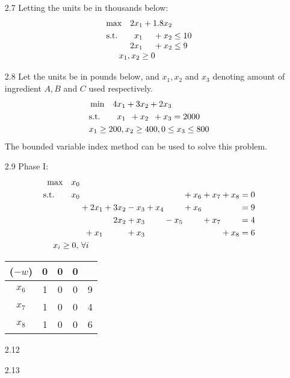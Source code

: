 \documentclass[a4paper,10pt]{article}
\theoremstyle{definition}
\begin{document}
\begin{enumerate}
\item[2.7]
Letting the units be in thousands below: 
\begin{align*}
  \begin{array}{r@{}r@{}l}
    \text{max} \quad 2x_1 &{}+ 1.8x_2 \\[\jot]
    \text{s.t.}\qquad x_1 &{}+ x_2&{} \leq 10 \\
    2x_1 &{}+ x_2&{} \leq 9 \\
     \multicolumn{2}{c}{x_1, x_2 \geq 0}
  \end{array}
\end{align*}
\item[2.8]
Let the units be in pounds below, and $x_1, x_2$ and $x_3$ denoting amount of ingredient $A, B$ and $C$ used respectively.
\begin{align*}
  \begin{array}{r@{}r@{}r@{}l}
    \text{min} \quad 4x_1 &{}+ 3x_2&{}+2x_3 \\[\jot]
    \text{s.t.}\qquad    x_1 &{}+ x_2&{}+x_3&{}=2000 \\[\jot]
     \multicolumn{4}{c}{x_1 \geq 200, x_2 \geq 400 , 0 \leq x_3 \leq 800}
  \end{array}
\end{align*}
The bounded variable index method can be used to solve this problem.

\item[2.9]
Phase I:
\begin{align*}
  \begin{array}{r@{}r@{}r@{}r@{}r@{}r@{}r@{}r@{}r@{}l}
    \text{max} \quad x_0 &{}&{}\\[\jot]
    \text{s.t.}\qquad x_0 &{}&{}&{}&{}&{}&{}+x_6&{}+x_7&{}+x_8&{}=0\\[\jot]
    &{}+2x_1 &{}+3x_2&{}-x_3&{}+x_4 &{} &{} +x_6 &{} &{}&{}=9  \\[\jot]
    &{}&{}2x_2&{}+x_3&{} &{}-x_5 &{} &{}+x_7&{}&{} = 4 \\[\jot]
   &{}+x_1&{}&{}+x_3&{} &{}&{} &{}&{}+x_8&{}= 6 \\ [\jot]
     \multicolumn{2}{c}{x_i \geq 0,\, \forall i}
  \end{array}
\end{align*}
\begin{table}[h]
\centering
\begin{tabular}{c|ccc|c}
($-w$) & 0 & 0 & 0 & \\
\hline
$x_6$ & 1 & 0 & 0 & 9\\
$x_7$ & 1 & 0 & 0 & 4\\
$x_8$ & 1 & 0 & 0 & 6\\
\end{tabular}
\end{table}
\item[2.12]
\item[2.13]
\end{enumerate}
\end{document}
